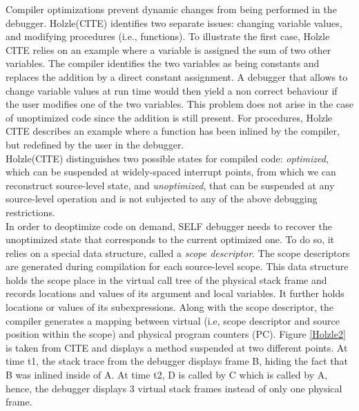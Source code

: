 Compiler optimizations prevent dynamic changes from being performed in the debugger.
Holzle(CITE) identifies two separate issues: changing variable values, and modifying procedures (i.e., functions).
To illustrate the first case, Holzle CITE relies on an example where a variable is assigned the sum of two other variables.
The compiler identifies the two variables as being constants and replaces the addition by a direct constant assignment.
A debugger that allows to change variable values at run time would then yield a non correct behaviour if the user modifies one of the two variables. 
This problem does not arise in the case of unoptimized code since the addition is still present. 
For procedures, Holzle CITE describes an example where a function has been inlined by the compiler, but redefined by the user in the debugger.\\

Holzle(CITE) distinguishes two possible states for compiled code: \textit{optimized}, which can be suspended at widely-spaced interrupt points, from which we can reconstruct source-level state, and \textit{unoptimized}, that can be suspended at any source-level operation and is not subjected to any of the above debugging restrictions.\\

In order to deoptimize code on demand, SELF debugger needs to recover the unoptimized state that corresponds to the current optimized one. 
To do so, it relies on a special data structure, called a \textit{scope descriptor}. 
The scope descriptors are generated during compilation for each source-level scope. 
This data structure holds the scope place in the virtual call tree of the physical stack frame and records locations and values of its argument and local variables. 
It further holds locations or values of its subexpressions.
Along with the scope descriptor, the compiler generates a mapping between virtual (i.e, scope descriptor and source position within the scope) and physical program counters (PC).
Figure \ref{Holzle2} is taken from CITE and displays a method suspended at two different points. 
At time t1, the stack trace from the debugger displays frame B, hiding the fact that B was inlined inside of A.
At time t2, D is called by C which is called by A, hence, the debugger displays 3 virtual stack frames instead of only one physical frame.\\

